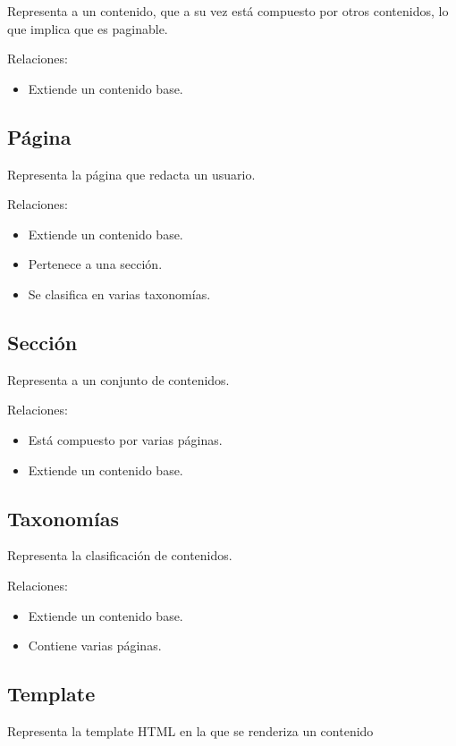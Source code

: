 Representa a un contenido, que a su vez está compuesto por otros contenidos, lo que implica
que es paginable.

Relaciones:
\begin{itemize}
    \item Extiende un contenido base.
\end{itemize}

\subsection{Página}

Representa la página que redacta un usuario.

Relaciones:
\begin{itemize}
    \item Extiende un contenido base.
    \item Pertenece a una sección.
    \item Se clasifica en varias taxonomías.
\end{itemize}

\subsection{Sección}

Representa a un conjunto de contenidos.

Relaciones:
\begin{itemize}
    \item Está compuesto por varias páginas.
    \item Extiende un contenido base.
\end{itemize}

\subsection{Taxonomías}

Representa la clasificación de contenidos.

Relaciones:
\begin{itemize}
    \item Extiende un contenido base.
    \item Contiene varias páginas.
\end{itemize}

\subsection{Template}

Representa la template HTML en la que se renderiza un contenido

